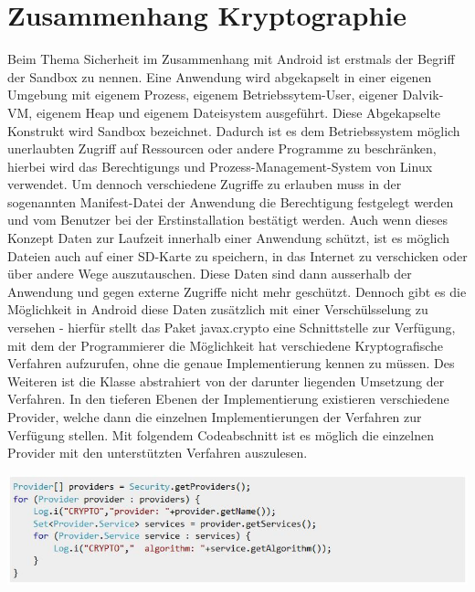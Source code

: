 \documentclass[10pt, a4paper]{scrreprt}
\begin{document}
\section{Zusammenhang Kryptographie}
Beim Thema Sicherheit im Zusammenhang mit Android ist erstmals der Begriff der Sandbox zu nennen. Eine Anwendung wird abgekapselt in einer eigenen Umgebung mit eigenem Prozess, eigenem Betriebssytem-User, eigener Dalvik-VM, eigenem Heap und eigenem Dateisystem ausgeführt. Diese Abgekapselte Konstrukt wird Sandbox bezeichnet. Dadurch ist es dem Betriebssystem möglich unerlaubten Zugriff auf Ressourcen oder andere Programme zu beschränken, hierbei wird das Berechtigungs und Prozess-Management-System von Linux verwendet. %
Um dennoch verschiedene Zugriffe zu erlauben muss in der sogenannten Manifest-Datei der Anwendung die Berechtigung festgelegt werden und vom Benutzer bei der Erstinstallation bestätigt werden.
Auch wenn dieses Konzept Daten zur Laufzeit innerhalb einer Anwendung schützt, ist es möglich Dateien auch auf einer SD-Karte zu speichern, in das Internet zu verschicken oder über andere Wege auszutauschen. Diese Daten sind dann ausserhalb der Anwendung und gegen externe Zugriffe nicht mehr geschützt.
Dennoch gibt es die Möglichkeit in Android diese Daten zusätzlich mit einer Verschülsselung zu versehen - hierfür stellt das Paket javax.crypto eine Schnittstelle zur Verfügung, mit dem der Programmierer die Möglichkeit hat verschiedene Kryptografische Verfahren aufzurufen, ohne die genaue Implementierung kennen zu müssen. Des Weiteren ist die Klasse abstrahiert von der darunter liegenden Umsetzung der Verfahren. %
In den tieferen Ebenen der Implementierung existieren verschiedene Provider, welche dann die einzelnen Implementierungen der Verfahren zur Verfügung stellen. Mit folgendem Codeabschnitt ist es möglich die einzelnen Provider mit den unterstützten Verfahren auszulesen. \\
\begin{center}
\includegraphics[scale=1.0]{read_cryptoprovider.JPG} %
\end{center}
\end{document}
